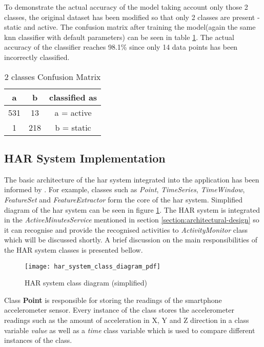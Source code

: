 To demonstrate the actual accuracy of the model taking account only those 2 classes, the original dataset has been modified so that only 2 classes are present - static and active. The confusion matrix after training the model(again the same \gls{knn} classifier with default parameters) can be seen in table \ref{table:2_class_confusion_matrix}. The actual accuracy of the classifier reaches 98.1\% since only 14 data points has been incorrectly classified.

    \begin{table}[ht]
    \centering
    \begin{tabular}{ |c|c|c| } 
     \hline
     a & b & classified as\\
     \hline \hline
      531 & 13 & a = active\\
      1 & 218 & b = static\\
     \hline
    \end{tabular}
    \caption{2 classes Confusion Matrix}
    \label{table:2_class_confusion_matrix}
    \end{table}
    
    \subsection{HAR System Implementation}
    \label{subsection:har-system-implementation}
    The basic architecture of the \gls{har} system integrated into the application has been informed by \citet[149]{labrador2013}. For example, classes such as \textit{Point}, \textit{TimeSeries}, \textit{TimeWindow}, \textit{FeatureSet} and \textit{FeatureExtractor} form the core of the \gls{har} system. Simplified diagram of the \gls{har} system can be seen in figure \ref{fig:har_system_impl_class_diagram}. The HAR system is integrated in the \textit{ActiveMinutesService} mentioned in section \ref{section:architectural-design} so it can recognise and provide the recognised activities to \textit{ActivityMonitor} class which will be discussed shortly. A brief discussion on the main responsibilities of the HAR system classes is presented bellow.
    
    \begin{figure}[ht]
        \centering
        \texttt{[image: har\_system\_class\_diagram\_pdf]}
        \caption{HAR system class diagram (simplified)}
        \label{fig:har_system_impl_class_diagram}
    \end{figure}
    
    Class \textbf{Point} is responsible for storing the readings of the smartphone accelerometer sensor. Every instance of the class stores the accelerometer readings such as the amount of acceleration in X, Y and Z direction in a class variable \textit{value} as well as a \textit{time} class variable which is used to compare different instances of the class.
        
